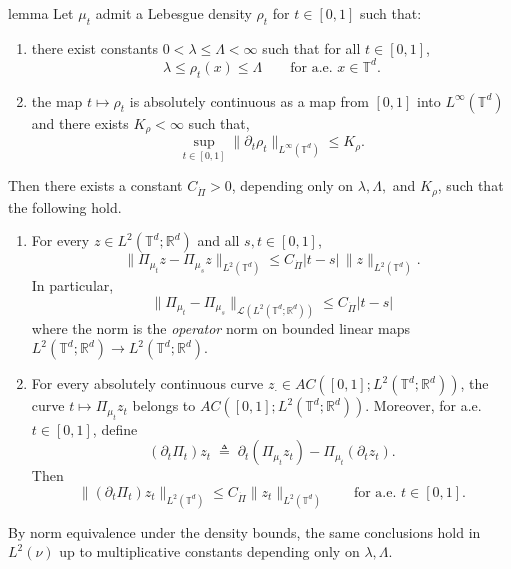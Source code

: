 \documentclass[11pt]{article}
\begin{document}
\begin{restatable}{lemma}{}
\label{lem:time_reg_weighted_projection}
Let $\mu_t$ admit a Lebesgue density $\rho_t$ for $t \in [0, 1]$ such that:
\begin{enumerate}
    \item there exist constants
    $0<\lambda\le \Lambda<\infty$ such that for all $t\in[0,1]$,
    \[
    \lambda \le \rho_t(x)\le \Lambda
    \qquad\text{for a.e. }x\in\mathbb{T}^d.
    \]
    \item the map $t \mapsto \rho_t$ is absolutely continuous as a map from $[0,1]$ into $L^\infty(\mathbb{T}^d)$ and there exists
    $K_\rho<\infty$ such that,
    \[
    \sup_{t\in[0,1]}\|\partial_t \rho_t\|_{L^\infty(\mathbb{T}^d)}\le K_\rho.
    \]
\end{enumerate}
Then there exists a constant $C_{\dot \Pi}>0$, depending only on
$\lambda,\Lambda,$ and $K_\rho$, such that the following hold.
\begin{enumerate}
    \item For every $z\in L^2(\mathbb{T}^d;\mathbb R^d)$ and all
    $s,t\in[0,1]$,
    \[
    \|\Pi_{\mu_t}z-\Pi_{\mu_s}z\|_{L^2(\mathbb{T}^d)}
    \le
    C_{\dot\Pi}|t-s|\,\|z\|_{L^2(\mathbb{T}^d)}.
    \]
    In particular,
    \[
    \|\Pi_{\mu_t}-\Pi_{\mu_s}\|_{\mathcal L(L^2(\mathbb{T}^d;\mathbb R^d))}
    \le
    C_{\dot\Pi}|t-s|
    \]
    where the norm is the \textit{operator} norm on bounded linear maps $L^2(\mathbb{T}^d; \mathbb{R}^d) \rightarrow L^2(\mathbb{T}^d; \mathbb{R}^d).$
    \item For every absolutely continuous curve
    $z_\cdot \in AC([0,1];L^2(\mathbb{T}^d;\mathbb R^d))$, the curve
    $t\mapsto \Pi_{\mu_t}z_t$ belongs to
    $AC([0,1];L^2(\mathbb{T}^d;\mathbb R^d))$.
    Moreover, for a.e. $t\in[0,1]$, define
    \[
    (\partial_t\Pi_t)z_t
    \;\triangleq\;
    \partial_t(\Pi_{\mu_t}z_t)-\Pi_{\mu_t}(\partial_t z_t).
    \]
    Then
    \[
    \|(\partial_t\Pi_t)z_t\|_{L^2(\mathbb{T}^d)}
    \le
    C_{\dot\Pi}\|z_t\|_{L^2(\mathbb{T}^d)}
    \qquad\text{for a.e. }t\in[0,1].
    \]
\end{enumerate}
By norm equivalence under the density bounds, the same conclusions hold in
$L^2(\nu)$ up to multiplicative constants depending only on $\lambda,\Lambda$.
\end{restatable}
\end{document}
